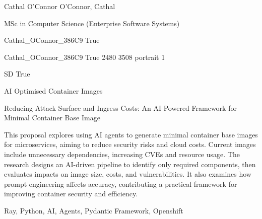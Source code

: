 
\begingroup{}\relax



\def\Key{Cathal_OConnor_386C9}

{Cathal O'Connor}
{O'Connor, Cathal}

{MSc in Computer Science (Enterprise Software Systems)}

{Cathal_OConnor_386C9}
{True}

{Cathal_OConnor_386C9}
{True}
{2480}
{3508}
{portrait}
{1}

{SD}
{True}

{AI Optimised Container Images}

{Reducing Attack Surface and Ingress Costs: An AI-Powered Framework for Minimal Container Base Image}

{This proposal explores using AI agents to generate minimal container base images for microservices, aiming to reduce security risks and cloud costs. Current images include unnecessary dependencies, increasing CVEs and resource usage. The research designs an AI-driven pipeline to identify only required components, then evaluates impacts on image size, costs, and vulnerabilities. It also examines how prompt engineering affects accuracy, contributing a practical framework for improving container security and efficiency.}

{Ray, Python, AI, Agents, Pydantic Framework, Openshift}

